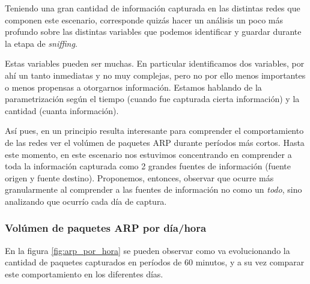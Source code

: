 \par Teniendo una gran cantidad de informaci\'on capturada en las distintas redes
que componen este escenario, corresponde quiz\'as hacer un an\'alisis un poco
m\'as profundo sobre las distintas variables que podemos identificar y guardar
durante la etapa de \textit{sniffing}.

\par Estas variables pueden ser muchas. En particular identificamos dos variables,
por ah\'i un tanto inmediatas y no muy complejas, pero no por ello menos importantes
o menos propensas a otorgarnos informaci\'on. Estamos hablando de la parametrizaci\'on
seg\'un el tiempo (cuando fue capturada cierta informaci\'on) y la cantidad (cuanta
informaci\'on).

\par As\'i pues, en un principio resulta interesante para comprender el comportamiento
de las redes ver el vol\'umen de paquetes ARP durante per\'iodos m\'as cortos. Hasta
este momento, en este escenario nos estuvimos concentrando en comprender a toda la
informaci\'on capturada como 2 grandes fuentes de informaci\'on (fuente origen y
fuente destino). Proponemos, entonces, observar que ocurre m\'as granularmente
al comprender a las fuentes de informaci\'on no como un \textit{todo}, sino analizando
que ocurr\'io cada d\'ia de captura.


\subsubsection{Vol\'umen de paquetes ARP por d\'ia/hora}
\par En la figura \ref{fig:arp_por_hora} se pueden observar como
va evolucionando la cantidad de paquetes capturados en per\'iodos de 60 minutos, y a
su vez comparar este comportamiento en los diferentes d\'ias.

